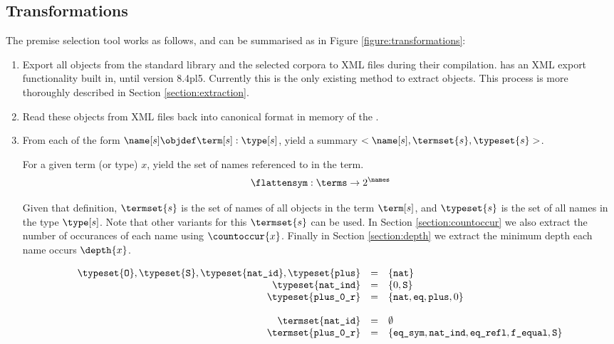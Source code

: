 \subsection{Transformations}
The premise selection tool works as follows, and can be summarised as in Figure \ref{figure:transformations}:
\begin{enumerate}
    \item Export all \coq objects from the standard library and the selected corpora to XML files during their compilation.
		\coq has an XML export functionality built in, until version 8.4pl5.
		Currently this is the only existing method to extract \coq objects.
		This process is more thoroughly described in Section \ref{section:extraction}.
	\item Read these objects from XML files back into canonical \acic{} format in memory of the \preloader.
	\item From each \coqobj[s] of the form $\name[s] \objdef \term[s] : \type[s]$,
		yield a summary $<\name[s], \termset{s}, \typeset{s}>$.
		\begin{definition}[$\flatten{x}$]
			For a given term (or type) $x$, yield the set of names referenced to in the term.
			\[ \flattensym : \terms \rightarrow 2^{\names} \]
		\end{definition}
		Given that definition, $\termset{s}$ is the set of names of all objects in the term $\term[s]$,
		and $\typeset{s}$ is the set of all names in the type $\type[s]$.
		Note that other variants for this $\termset{s}$ can be used.
		In Section \ref{section:countoccur} we also extract the number of occurances of each name using $\countoccur{x}$.
		Finally in Section \ref{section:depth} we extract the minimum depth each name occurs $\depth{x}$.
		\begin{figure}[H]
			\[
				\begin{array}{rcl}
					\typeset{\texttt{O}}, \typeset{\texttt{S}}, \typeset{\texttt{nat\_id}}, \typeset{\texttt{plus}} & = & \{ \texttt{nat} \}\\
					\typeset{\texttt{nat\_ind}} & = & \{ 0, \texttt{S} \} \\
					\typeset{\texttt{plus\_0\_r}} & = & \{ \texttt{nat}, \texttt{eq}, \texttt{plus}, 0 \} \\
					& & \\
					\termset{\texttt{nat\_id}} & = & \emptyset \\
					\termset{\texttt{plus\_0\_r}} & = & \{ \texttt{eq\_sym}, \texttt{nat\_ind}, \texttt{eq\_refl}, \texttt{f\_equal}, \texttt{S} \}

\end{array}\]
\end{figure}
\end{enumerate}

